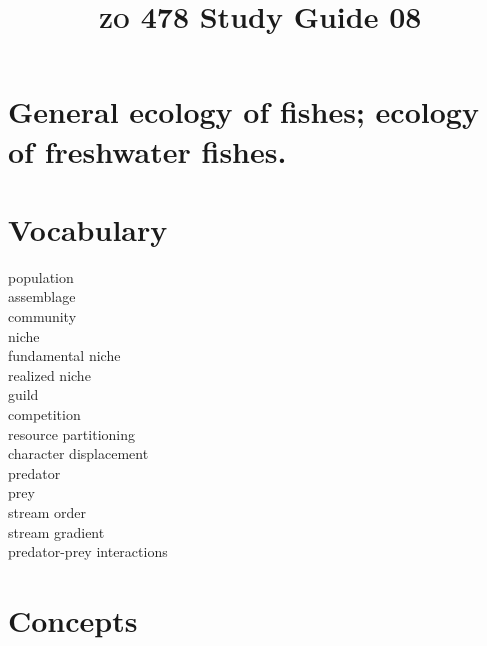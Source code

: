 \documentclass[letterpaper]{tufte-handout}
\title{{\scshape zo} 478 Study Guide 08}
\date{} %
\begin{document}
\maketitle	%

\section*{General ecology of fishes; ecology of freshwater fishes.}


\section{Vocabulary} 
\vspace{-1\baselineskip}
\begin{multicols}{2}
population \\
assemblage \\
community \\
niche \\
fundamental niche \\
realized niche \\
guild \\
competition \\
resource partitioning \\
character displacement \\
predator \\
prey \\
stream order \\
stream gradient \\
predator-prey interactions
\end{multicols}

\section{Concepts}
\end{document}
